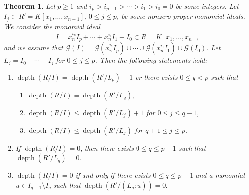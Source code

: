 \documentclass[11pt]{amsart}
\newtheorem{theorem}{Theorem}[section]
\def\depth{\operatorname{depth}}
\begin{document}
\begin{theorem}\label{t2}
Let $p\geq 1$ and $i_p>i_{p-1}>\cdots>i_1>i_0=0$ be some integers. Let $I_j\subset R'=K[x_1,\ldots,x_{n-1}]$, $0\leq j\leq p$, be some nonzero 
proper monomial ideals. We consider the monomial ideal 
$$I=x_n^{i_p}I_p + \cdots + x_n^{i_1}I_1 + I_0 \subset R=K[x_1,\ldots,x_n],$$ and we assume that
 $\mathcal{G}(I)=\mathcal{G}(x_n^{i_p}I_p) \cup \cdots \cup \mathcal{G}(x_n^{i_1}I_1) \cup \mathcal{G}(I_0).$ 
Let $L_j=I_0+\cdots+I_j$  for $0\leq j\leq p$.
Then the following statements hold:
\begin{enumerate}
\item[(1)] $\depth(R/I)=\depth(R'/L_p)+1$ or there exists $0\leq q<p$ such that
           \begin{enumerate}
           \item $\depth(R/I)=\depth(R'/L_q)$,
           \item $\depth(R/I)\leq \depth(R'/L_j)+1$  for $0\leq j\leq q-1$,
					 \item $\depth(R/I)\leq \depth(R'/L_j)$  for $q+1\leq j\leq p$.
					 \end{enumerate}
\item[(2)] If $\depth(R/I)=0$,  then there exists $0\leq q\leq p-1$ such that  $\depth(R'/L_q)=0$.
\item[(3)] $\depth(R/I)=0$ if and only if there exists $0\leq q\leq p-1$ and a monomial $u\in I_{q+1}\setminus I_q$ such that $\depth(R'/(L_q:u))=0$.
\end{enumerate}
\end{theorem}
\end{document}
